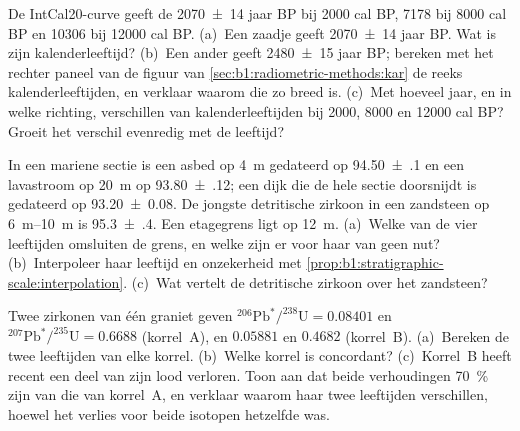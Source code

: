 \begin{exercise}[$\star\star$]\label{exo:b1:radiometric-methods:7}
De IntCal20-curve geeft de  \num[uncertainty-mode=separate]{2070 \pm 14} jaar BP bij \num{2000} cal BP, \num{7178} bij \num{8000} cal BP en \num{10306} bij \num{12000} cal BP. (a)~Een zaadje geeft \num[uncertainty-mode=separate]{2070 \pm 14} jaar BP. Wat is zijn kalenderleeftijd? (b)~Een ander geeft \num[uncertainty-mode=separate]{2480 \pm 15} jaar BP; bereken met het rechter paneel van de figuur van \cref{sec:b1:radiometric-methods:kar} de reeks kalenderleeftijden, en verklaar waarom die zo breed is. (c)~Met hoeveel jaar, en in welke richting, verschillen  van kalenderleeftijden bij \num{2000}, \num{8000} en \num{12000} cal BP? Groeit het verschil evenredig met de leeftijd?
\end{exercise}

\begin{exercise}[$\star\star$]\label{exo:b1:radiometric-methods:8}
In een mariene sectie is een asbed op \qty{4}{m} gedateerd op \qty[uncertainty-mode=separate]{94.50(10)}{\Ma} en een lavastroom op \qty{20}{m} op \qty[uncertainty-mode=separate]{93.80(12)}{\Ma}; een dijk die de hele sectie doorsnijdt is gedateerd op \qty[uncertainty-mode=separate]{93.20(8)}{\Ma}. De jongste detritische zirkoon in een zandsteen op \qtyrange{6}{10}{m} is \qty[uncertainty-mode=separate]{95.3(4)}{\Ma}. Een etagegrens ligt op \qty{12}{m}. (a)~Welke van de vier leeftijden omsluiten de grens, en welke zijn er voor haar van geen nut? (b)~Interpoleer haar leeftijd en onzekerheid met \cref{prop:b1:stratigraphic-scale:interpolation}. (c)~Wat vertelt de detritische zirkoon over het zandsteen?
\end{exercise}

\begin{exercise}[$\star\star$]\label{exo:b1:radiometric-methods:9}
Twee zirkonen van één graniet geven $^{206}\mathrm{Pb}^*/^{238}\mathrm{U} = 0.08401$ en $^{207}\mathrm{Pb}^*/^{235}\mathrm{U} = 0.6688$ (korrel~A), en $0.05881$ en $0.4682$ (korrel~B). (a)~Bereken de twee leeftijden van elke korrel. (b)~Welke korrel is concordant? (c)~Korrel~B heeft recent een deel van zijn lood verloren. Toon aan dat beide verhoudingen \qty{70}{\percent} zijn van die van korrel~A, en verklaar waarom haar twee leeftijden verschillen, hoewel het verlies voor beide isotopen hetzelfde was.
\end{exercise}


